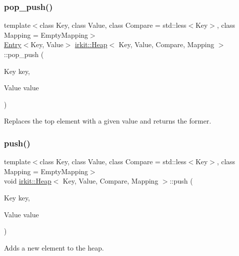 \subsubsection{\texorpdfstring{pop\+\_\+push()}{pop\_push()}}
{\footnotesize\ttfamily template$<$class Key, class Value, class Compare = std\+::less$<$\+Key$>$, class Mapping = Empty\+Mapping$>$ \\
\mbox{\hyperlink{structirkit_1_1Entry}{Entry}}$<$Key, Value$>$ \mbox{\hyperlink{classirkit_1_1Heap}{irkit\+::\+Heap}}$<$ Key, Value, Compare, Mapping $>$\+::pop\+\_\+push (\begin{DoxyParamCaption}\item[{Key}]{key,  }\item[{Value}]{value }\end{DoxyParamCaption})\hspace{0.3cm}{\ttfamily [inline]}}



Replaces the top element with a given value and returns the former. 

\mbox{\label{classirkit_1_1Heap_a8e2dfbd02e7411fe97281b5e7d19f12c}} 
\subsubsection{\texorpdfstring{push()}{push()}}
{\footnotesize\ttfamily template$<$class Key, class Value, class Compare = std\+::less$<$\+Key$>$, class Mapping = Empty\+Mapping$>$ \\
void \mbox{\hyperlink{classirkit_1_1Heap}{irkit\+::\+Heap}}$<$ Key, Value, Compare, Mapping $>$\+::push (\begin{DoxyParamCaption}\item[{Key}]{key,  }\item[{Value}]{value }\end{DoxyParamCaption})\hspace{0.3cm}{\ttfamily [inline]}}



Adds a new element to the heap. 

\mbox{\label{classirkit_1_1Heap_ae4652d2601229e4de97f0321adf5f3c6}} 
